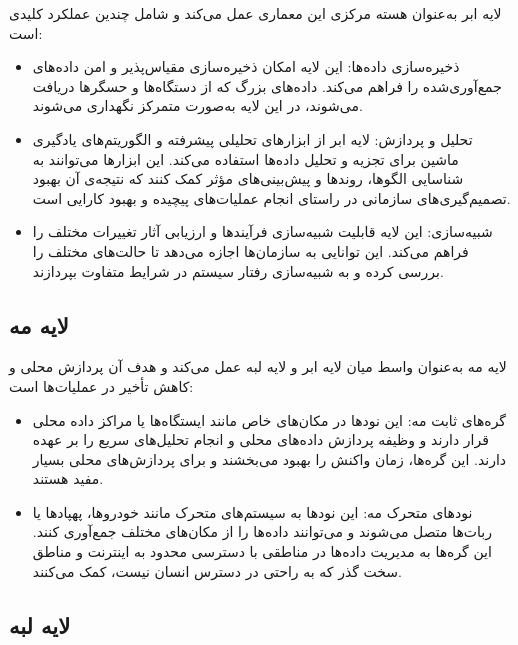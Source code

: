 لایه ابر به‌عنوان هسته مرکزی این معماری عمل می‌کند و شامل چندین عملکرد کلیدی است:
\begin{itemize}
	\item ذخیره‌سازی داده‌ها:
	این لایه امکان ذخیره‌سازی مقیاس‌پذیر و امن داده‌های جمع‌آوری‌شده را فراهم می‌کند. داده‌های بزرگ که از دستگاه‌ها و حسگرها دریافت می‌شوند، در این لایه به‌صورت متمرکز نگهداری می‌شوند.
	
	\item 
	تحلیل و پردازش: 
	لایه ابر از ابزارهای تحلیلی پیشرفته و الگوریتم‌های یادگیری ماشین برای تجزیه و تحلیل داده‌ها استفاده می‌کند. این ابزارها می‌توانند به شناسایی الگوها، روندها و پیش‌بینی‌های مؤثر کمک کنند که نتیجه‌ی آن بهبود تصمیم‌گیری‌های سازمانی در راستای انجام عملیات‌های پیچیده و بهبود کارایی است.
	
	\item
	شبیه‌سازی:
	 این لایه قابلیت شبیه‌سازی فرآیندها و ارزیابی آثار تغییرات مختلف را فراهم می‌کند. این توانایی به سازمان‌ها اجازه می‌دهد تا حالت‌های مختلف را بررسی کرده و به شبیه‌سازی رفتار سیستم در شرایط متفاوت بپردازند.
	
\end{itemize}

\subsection{لایه مه}

لایه مه به‌عنوان واسط میان لایه ابر و لایه لبه عمل می‌کند و هدف آن پردازش محلی و کاهش تأخیر در عملیات‌ها است:
\begin{itemize}
	\item 
	
گره‌های ثابت مه:
	این نودها در مکان‌های خاص مانند ایستگاه‌ها یا مراکز داده محلی قرار دارند و وظیفه پردازش داده‌های محلی و انجام تحلیل‌های سریع را بر عهده دارند. این گره‌ها، زمان واکنش‌ را بهبود می‌بخشند و برای پردازش‌های محلی بسیار مفید هستند.
	
	\item 
	
نودهای متحرک مه:
	این نودها به سیستم‌های متحرک مانند خودروها، پهپادها یا ربات‌ها متصل می‌شوند و می‌توانند داده‌ها را از مکان‌های مختلف جمع‌آوری کنند. این گره‌ها به مدیریت داده‌ها در مناطقی با دسترسی محدود به اینترنت و مناطق سخت‌ گذر که به راحتی در دسترس انسان نیست، کمک می‌کنند.
\end{itemize}

\subsection{لایه لبه}

